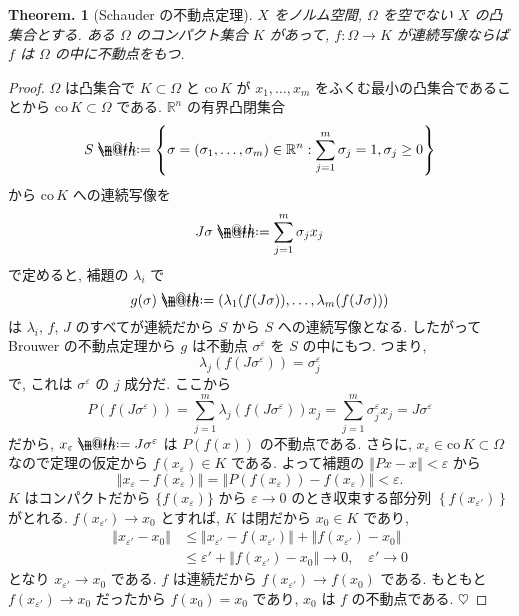 \documentclass[openany, a4paper, oneside]{book}
\makeatletter
\newcommand*{\defeq}{\mathrel{\rlap{%
\raisebox{0.3ex}{$\m@th\cdot$}}%
\raisebox{-0.3ex}{$\m@th\cdot$}}%
=}
\newcommand{\co}{\mathrm{co}\,}
\theoremstyle{break}
\newtheorem{thm}{Theorem.}[section]
\theoremstyle{breakdefn}
\newcommand{\norm}[1]{\left\Vert#1\right\Vert}
\newcommand{\rbk}[1]{\left (#1\right)}
\newcommand{\cbk}[1]{\left\{#1\right\}}
\newcommand{\set}[2]{\left\{#1 : #2\right\}}
\newcommand{\bbRn}{\mathbb{R}^n}
\makeatother
\begin{document}
\begin{thm}[Schauder の不動点定理]
 $X$ をノルム空間, $\Omega$ を空でない $X$ の凸集合とする.
 ある $\Omega$ のコンパクト集合 $K$ があって,  $f \colon \Omega \to K$ が連続写像ならば $f$ は $\Omega$ の中に不動点をもつ.
\end{thm}
\begin{proof}
$\Omega$ は凸集合で $K \subset \Omega$ と $\co K$ が $x_1, \dots , x_m$
をふくむ最小の凸集合であることから $\co K \subset \Omega$ である.
$\bbRn$ の有界凸閉集合
\begin{align}
 S
 \defeq
 \set{\sigma = (\sigma_1, \dots , \sigma_m) \in \bbRn}{\sum_{j=1}^m \sigma_j = 1, \sigma_j \ge 0}
\end{align}
から $\co K$ への連続写像を
\begin{equation}
 J \sigma
 \defeq
 \sum_{j=1}^m \sigma_j x_j
\end{equation}
で定めると, 補題の $\lambda_i$ で
\begin{equation}
 g (\sigma)
 \defeq
 \rbk{\lambda_1 (f (J\sigma)), \dots , \lambda_m (f (J\sigma))}
\end{equation}
は $\lambda_i$, $f$,  $J$ のすべてが連続だから $S$ から $S$ への連続写像となる.
したがって Brouwer の不動点定理から $g$ は不動点 $\sigma^\varepsilon$ を $S$ の中にもつ.
つまり,
\begin{equation}
 \lambda_j (f (J\sigma^\varepsilon))
 =
 \sigma_j^\varepsilon
\end{equation}
で, これは $\sigma^\varepsilon$ の $j$ 成分だ.
ここから
\begin{equation}
 P (f (J\sigma^{\varepsilon}))
 =
 \sum_{j=1}^m \lambda_j (f (J\sigma^{\varepsilon})) x_j
 =
 \sum_{j=1}^m \sigma_j^{\varepsilon} x_j
 =
 J\sigma^{\varepsilon}
\end{equation}
だから, $x_\varepsilon \defeq J \sigma^\varepsilon$ は $P(f(x))$ の不動点である.
さらに, $x_\varepsilon \in \co K \subset \Omega$ なので定理の仮定から
$f (x_\varepsilon) \in K$ である.
よって補題の $\norm{Px - x} < \varepsilon$ から
\begin{equation}
 \norm{x_{\varepsilon} - f (x_{\varepsilon})}
 =
 \norm{P (f (x_\varepsilon)) - f (x_\varepsilon)}
 <
 \varepsilon.
\end{equation}
$K$ はコンパクトだから $\{f (x_\varepsilon)\}$ から $\varepsilon \to 0$ のとき収束する部分列
$\cbk{f (x_{\varepsilon'})}$ がとれる.
$f (x_{\varepsilon'}) \to x_0$ とすれば, $K$ は閉だから $x_0 \in K$ であり,
\begin{align}
 \norm{x_{\varepsilon'} - x_0}
 &\le
 \norm{x_{\varepsilon'} - f (x_{\varepsilon'})}
  +\norm{f (x_{\varepsilon'}) - x_0}   \\
 &\le
 \varepsilon' + \norm{f(x_{\varepsilon'}) - x_0}
 \to 0, \quad \varepsilon' \to 0
\end{align}
となり $x_{\varepsilon'} \to x_0$ である.
$f$ は連続だから $f (x_{\varepsilon'}) \to f (x_0)$ である.
もともと $f (x_{\varepsilon'}) \to x_0$ だったから $f (x_0) = x_0$ であり, $x_0$ は $f$ の不動点である.
$\heartsuit$
\end{proof}
\end{document}
